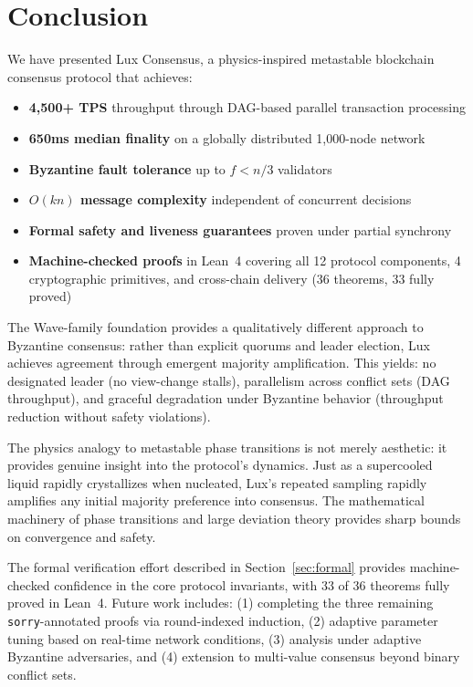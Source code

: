 \section{Conclusion}

\label{sec:conclusion}

We have presented Lux Consensus, a physics-inspired metastable blockchain consensus
protocol that achieves:

\begin{itemize}[nosep]
\item \textbf{4,500+ TPS} throughput through DAG-based parallel transaction processing
\item \textbf{650ms median finality} on a globally distributed 1,000-node network
\item \textbf{Byzantine fault tolerance} up to $f < n/3$ validators
\item \textbf{$O(kn)$ message complexity} independent of concurrent decisions
\item \textbf{Formal safety and liveness guarantees} proven under partial synchrony
\item \textbf{Machine-checked proofs} in Lean~4 covering all 12 protocol components,
4 cryptographic primitives, and cross-chain delivery (36 theorems, 33 fully proved)
\end{itemize}

The Wave-family foundation provides a qualitatively different approach to Byzantine
consensus: rather than explicit quorums and leader election, Lux achieves agreement through
emergent majority amplification. This yields: no designated leader (no view-change stalls),
parallelism across conflict sets (DAG throughput), and graceful degradation under Byzantine
behavior (throughput reduction without safety violations).

The physics analogy to metastable phase transitions is not merely aesthetic: it provides
genuine insight into the protocol's dynamics. Just as a supercooled liquid rapidly
crystallizes when nucleated, Lux's repeated sampling rapidly amplifies any initial
majority preference into consensus. The mathematical machinery of phase transitions and
large deviation theory provides sharp bounds on convergence and safety.

The formal verification effort described in Section~\ref{sec:formal} provides
machine-checked confidence in the core protocol invariants, with 33 of 36 theorems
fully proved in Lean~4. Future work includes: (1) completing the three remaining
\texttt{sorry}-annotated proofs via round-indexed induction,
(2) adaptive parameter tuning based on real-time network conditions,
(3) analysis under adaptive Byzantine adversaries, and
(4) extension to multi-value consensus beyond binary conflict sets.

